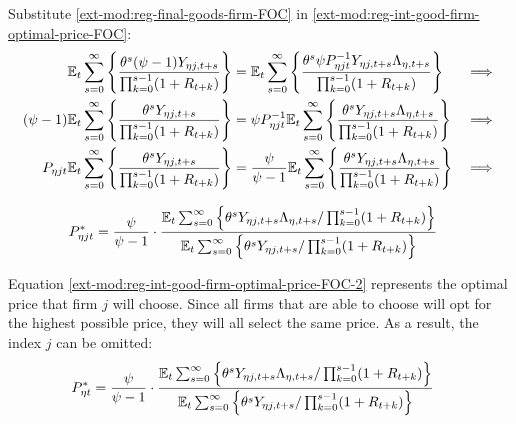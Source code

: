 \documentclass[../thesis.tex]{subfiles}
\begin{document}

Substitute \ref{ext-mod:reg-final-goods-firm-FOC} in \ref{ext-mod:reg-int-good-firm-optimal-price-FOC}:
\begin{alignat}{2}
	{\mathbb{E}_{t}} \sum_{s=0}^{\infty} \Bigg\{ \frac{\theta^s (\psi-1) Y_{\eta j,t+s}}{\prod_{k=0}^{s-1}(1+R_{t+k})} \Bigg\} &= {\mathbb{E}_{t}} \sum_{s=0}^{\infty} \Bigg\{ \frac{\theta^s \psi P_{\eta jt}^{-1} Y_{\eta j,t+s} \Lambda_{\eta, t+s}}{\prod_{k=0}^{s-1}(1+R_{t+k})}  \Bigg\} &\implies \nonumber \\
	(\psi-1) {\mathbb{E}_{t}} \sum_{s=0}^{\infty} \Bigg\{ \frac{\theta^s Y_{\eta j,t+s}}{\prod_{k=0}^{s-1}(1+R_{t+k})} \Bigg\} &= \psi P_{\eta jt}^{-1} {\mathbb{E}_{t}} \sum_{s=0}^{\infty} \Bigg\{ \frac{\theta^s Y_{\eta j,t+s} \Lambda_{\eta, t+s}}{\prod_{k=0}^{s-1}(1+R_{t+k})}  \Bigg\} &\implies \nonumber \\
	P_{\eta jt} {\mathbb{E}_{t}} \sum_{s=0}^{\infty} \Bigg\{ \frac{\theta^s Y_{\eta j,t+s}}{\prod_{k=0}^{s-1}(1+R_{t+k})} \Bigg\} &= \frac{\psi}{\psi-1} {\mathbb{E}_{t}} \sum_{s=0}^{\infty} \Bigg\{ \frac{\theta^s Y_{\eta j,t+s} \Lambda_{\eta, t+s}}{\prod_{k=0}^{s-1}(1+R_{t+k})}  \Bigg\} &\implies \nonumber
\end{alignat}

\vspace*{-1cm}

\begin{align}
	\label{ext-mod:reg-int-good-firm-optimal-price-FOC-2}
	P_{\eta jt}^{\ast} &= 
	\frac{\psi}{\psi-1} \cdot
	\frac{
		{\mathbb{E}_{t}} \sum_{s=0}^{\infty} \left\{ 
		\theta^s Y_{\eta j,t+s} \Lambda_{\eta, t+s} / \prod_{k=0}^{s-1}(1+R_{t+k}) \right\}} {{\mathbb{E}_{t}} \sum_{s=0}^{\infty} \left\{
		\theta^s Y_{\eta j,t+s} / \prod_{k=0}^{s-1}(1+R_{t+k}) \right\}}
\end{align}


Equation \ref{ext-mod:reg-int-good-firm-optimal-price-FOC-2} represents the optimal price that firm $j$ will choose. Since all firms that are able to choose will opt for the highest possible price, they will all select the same price. As a result, the index $j$ can be omitted:
\begin{align}
	\label{ext-mod:reg-int-good-firm-optimal-price-FOC-3}
	P_{\eta t}^{\ast} &= 
	\frac{\psi}{\psi-1} \cdot
	\frac{
		{\mathbb{E}_{t}} \sum_{s=0}^{\infty} \left\{ 
		\theta^s Y_{\eta j,t+s} \Lambda_{\eta, t+s} / \prod_{k=0}^{s-1}(1+R_{t+k}) \right\}} {{\mathbb{E}_{t}} \sum_{s=0}^{\infty} \left\{
		\theta^s Y_{\eta j,t+s} / \prod_{k=0}^{s-1}(1+R_{t+k}) \right\}}
\end{align}
\end{document}
